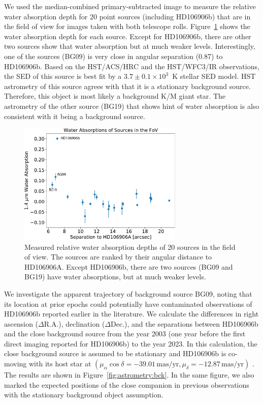 \documentclass[twocolumn]{aastex62}
\begin{document}
We used the median-combined primary-subtracted image to measure the relative water absorption depth for 20 point sources (including HD106906b) that are in the field of view for images taken with both telescope rolls. Figure~\ref{fig:backgroundsources} shows the water absorption depth for each source. Except for HD106906b, there are other two sources show that water absorption but at much weaker levels. Interestingly, one of the sources (BG09) {is very close in angular separation} (0.87\arcsec) to HD106906b.  Based on the HST/ACS/HRC and the HST/WFC3/IR observations, the SED of this source is best fit by a $3.7\pm0.1\times10^{3}$~K stellar SED model. HST astrometry of this source agrees with  that it is a stationary background source. Therefore, this object is most likely a background K/M giant star. The astrometry of the other source (BG19) that shows hint of water absorption is also consistent with it being a background source.

\begin{figure}
  \centering
  \includegraphics[width=0.7\textwidth]{figures/bck_waterdepth.pdf}
  \caption[Measured relative water absorption depths of 20 sources in the field of view for the WFC3 observations of HD106906b.]{Measured relative water absorption depths of 20 sources in the field of view. The sources are ranked by their angular distance to HD106906A. Except HD106906b, there are two sources (BG09 and BG19) have water absorptions, but at much weaker levels.}
  \label{fig:backgroundsources}
\end{figure}

We investigate the {apparent trajectory} of background source BG09, {noting that its location at prior epochs could potentially have contaminated observations of HD106906b reported earlier in the literature}.  We calculate  the differences in right ascension ($\Delta${R.A.}),  declination ($\Delta${Dec.}), and the separations between HD106906b and the close background source from the year 2003 (one year before the first direct imaging {reported for} HD106906b) to the year 2023. In this calculation, the close background source is assumed to be stationary and HD106906b is co-moving with its host star at $(\mu_\alpha\cos\delta=-39.01\,\mbox{mas/yr}, \mu_{\delta}=-12.87\,\mbox{mas/yr})$ \citep{Gaia2016, Gaia2018}. The results are shown in Figure~\ref{fig:astrometry:bck}. In the same figure, we also marked the expected positions of the close companion in previous observations \citep{Bailey2013, Wu2016, Lagrange2016, Daemgen2017} with the stationary background object assumption.
\end{document}
